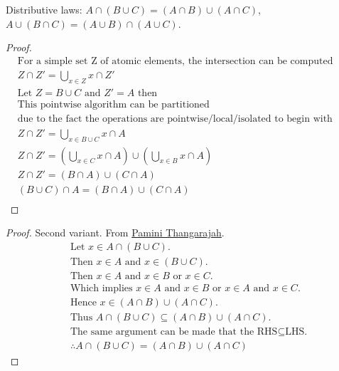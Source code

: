 \begin{question}
  Distributive laws: $A \cap (B \cup C) = (A \cap B) \cup (A \cap C)$, $A \cup (B \cap C) = (A \cup B) \cap (A \cup C)$.
\end{question}
\begin{proof}
  \begin{align*}
    & \text{For a simple set Z of atomic elements, the intersection can be computed pointwise} \\
    & Z \cap Z' = \bigcup_{x \in Z} {x} \cap Z' \\
    & \text{Let } Z = B \cup C \text{ and } Z' = A \text{ then} \\
    & \text{This pointwise algorithm can be partitioned} \\
    & \text{due to the fact the operations are pointwise/local/isolated to begin with} \\
    & Z \cap Z' = \bigcup_{x \in B \cup C} x \cap A \\
    & Z \cap Z' = (\bigcup_{x \in C} x \cap A) \cup (\bigcup_{x \in B} x \cap A) \\
    & Z \cap Z' = (B \cap A) \cup (C \cap A) \\
    & (B \cup C) \cap A = (B \cap A) \cup (C \cap A) \\
  \end{align*}
\end{proof}
\begin{proof}
  Second variant. From \href{https://math.libretexts.org/Courses/Mount_Royal_University/MATH_1150%3A_Mathematical_Reasoning/2%3A_Basic_Concepts_of_Sets/2.3%3A_Properties_of_Sets}{Pamini Thangarajah}.
  \begin{align*}
    & \text{Let } x \in A \cap (B \cup C). \\
    & \text{Then } x \in A \text{ and } x \in (B \cup C). \\
    & \text{Then } x \in A \text{ and } x \in B \text{ or } x \in C. \\
    & \text{Which implies } x \in A \text{ and } x \in B \text{ or } x \in A \text{ and } x \in C. \\
    & \text{Hence } x \in (A \cap B) \cup (A \cap C). \\
    & \text{Thus } A \cap (B \cup C) \subseteq (A \cap B) \cup (A \cap C). \\
    & \text{The same argument can be made that the RHS} \subseteq \text{LHS.} \\
    & \therefore A \cap (B \cup C) = (A \cap B) \cup (A \cap C)
  \end{align*}
\end{proof}

